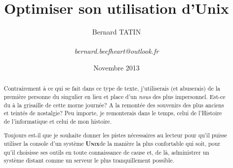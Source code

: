 \documentclass[11pt]{amsart} %
\title{Optimiser son utilisation d'Unix}
\author{Bernard TATIN \\
\small \\
\emph{bernard.beefheart@outlook.fr}}
\date{Novembre 2013} %
\makeatletter
\newcommand\osname[1]{\textsc{\textbf{#1}}\xspace\index{#1@\textsc{#1}}}
\newcommand\unix{\osname{Unix}}
\makeatother
\begin{document}
\maketitle

\begin{abstract}
Contrairement à ce qui se fait dans ce type de texte, j'utiliserais (et abuserais) de la première personne du singulier en lieu et place d'un \emph{nous} des plus impersonnel. Est-ce du à la grisaille de cette morne journée? A la remontée des souvenirs des plus anciens et teintés de nostalgie? Peu importe, je remonterais dans le temps, celui de l'Histoire de l'informatique et celui de mon histoire.

Toujours est-il que je souhaite donner les pistes nécessaires au lecteur pour qu'il puisse utiliser la console d'un système \unix de la manière la plus confortable qui soit, pour qu'il choisisse ses outils en toute connaissance de cause et, de là, administrer un système distant comme un serveur le plus tranquillement possible.
\end{abstract}

\tableofcontents





\printindex
\end{document}
